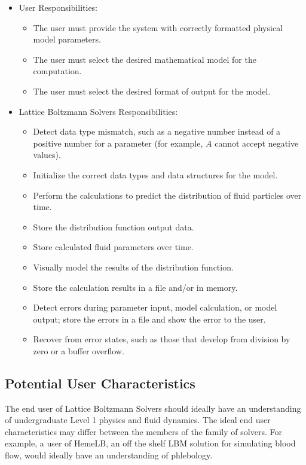\documentclass[12pt]{article}
\newcommand{\famname}{Lattice Boltzmann Solvers} %
\begin{document}
\begin{itemize}
\item User Responsibilities:
\begin{itemize}
\item The user must provide the system with correctly formatted physical model parameters.
\item The user must select the desired mathematical model for the computation.
\item The user must select the desired format of output for the model.
\end{itemize}
\item \famname{} Responsibilities:
\begin{itemize}
\item Detect data type mismatch, such as a negative number instead of a positive number for a parameter (for example, $A$ cannot accept negative values).
\item Initialize the correct data types and data structures for the model.
\item Perform the calculations to predict the distribution of fluid particles over time.
\item Store the distribution function output data.
\item Store calculated fluid parameters over time.
\item Visually model the results of the distribution function.
\item Store the calculation results in a file and/or in memory.
\item Detect errors during parameter input, model calculation, or model output; store the errors in a file and show the error to the user.
\item Recover from error states, such as those that develop from division by zero or a buffer overflow.
\end{itemize}
\end{itemize}

\subsection{Potential User Characteristics} \label{SecUserCharacteristics}

The end user of \famname{} should ideally have an understanding of undergraduate Level 1 physics and fluid dynamics. The ideal end user characteristics may differ between the members of the family of solvers. For example, a user of HemeLB, an off the shelf LBM solution for simulating blood flow, would ideally have an understanding of phlebology.
\end{document}
